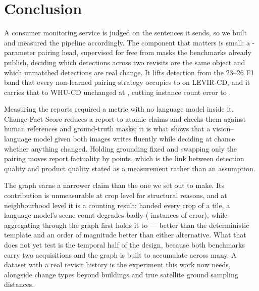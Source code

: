 \section{Conclusion}

A consumer monitoring service is judged on the sentences it sends, so we built
and measured the pipeline accordingly. The component that matters is small: a
\HeadParamsRound-parameter pairing head, supervised for free from masks the
benchmarks already publish, deciding which detections across two revisits are
the same object and which unmatched detections are real change. It lifts
detection from the 23--26 F1 band that every non-learned pairing strategy
occupies to \EOnePixelFOne{} on LEVIR-CD, and it carries that to WHU-CD
unchanged at \ETwoPixelFOne, cutting instance count error to \ETwoCountMAE.

Measuring the reports required a metric with no language model inside it.
Change-Fact-Score reduces a report to atomic claims and checks them against
human references and ground-truth masks; it is what shows that a
vision--language model given both images writes fluently while deciding at
chance whether anything changed. Holding grounding fixed and swapping only the
pairing moves report factuality by \EFiveGain{} points, which is the link
between detection quality and product quality stated as a measurement rather
than an assumption.

The graph earns a narrower claim than the one we set out to make. Its
contribution is unmeasurable at crop level for structural reasons, and at
neighbourhood level it is a counting result: handed every crop of a tile, a
language model's scene count degrades badly
(\ESevenStructCountMAE{} instances of error), while aggregating through the
graph first holds it to \ESevenGraphCountMAE{} --- better than the
deterministic template and an order of magnitude better than either
alternative. What that does not yet test is the temporal half of the design,
because both benchmarks carry two acquisitions and the graph is built to
accumulate across many. A dataset with a real revisit history is the experiment
this work now needs, alongside change types beyond buildings and true satellite
ground sampling distances.
